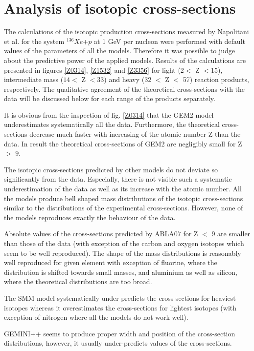 \section{Analysis of isotopic cross-sections}

The calculations of the isotopic production cross-sections measured by Napolitani et al. \cite{napolitani2007measurement} for the system $^{136}Xe$+$p$ at 1 GeV per nucleon were performed with default values of the parameters of all the models. Therefore it was possible to judge about the predictive power of the applied models. Results of the calculations are presented in figures \ref{Z0314}, \ref{Z1532} and \ref{Z3356} for light ($2 <$ Z $< 15$), intermediate mass ($14 <$ Z $< 33$) and heavy (32 $<$ Z $<$ 57) reaction products, respectively. The qualitative agreement of the theoretical cross-sections with the data will be discussed below for each range of the products separately. 

It is obvious from the inspection of fig. \ref{Z0314} that the GEM2 model underestimates systematically all the data. Furthermore, the theoretical cross-sections decrease much faster with increasing of the atomic number Z than the data. In result the theoretical cross-sections of GEM2 are negligibly small for Z $>$ 9. 

The isotopic cross-sections predicted by other models do not deviate so significantly from the data. Especially, there is not visible such a systematic underestimation of the data as well as its increase with the atomic number. 
All the models produce bell shaped mass distributions of the isotopic cross-sections similar to the distributions of the experimental cross-sections. However, none of the models reproduces exactly the behaviour of the data. 

Absolute values of the cross-sections predicted by ABLA07 for Z $<$ 9 are smaller than those of the data (with exception of the carbon and oxygen isotopes which seem to be well reproduced). The shape of the mass distributions is reasonably well reproduced for given element with exception of fluorine, where the distribution is shifted towards small masses, and aluminium as well as silicon, where the theoretical distributions are too broad. 

The SMM model systematically under-predicts the cross-sections for heaviest isotopes whereas it overestimates the cross-sections for lightest isotopes (with exception of nitrogen where all the models do not work well).

GEMINI++ seems to produce proper width and position of the cross-section distributions, however, it usually under-predicts values of the cross-sections.

